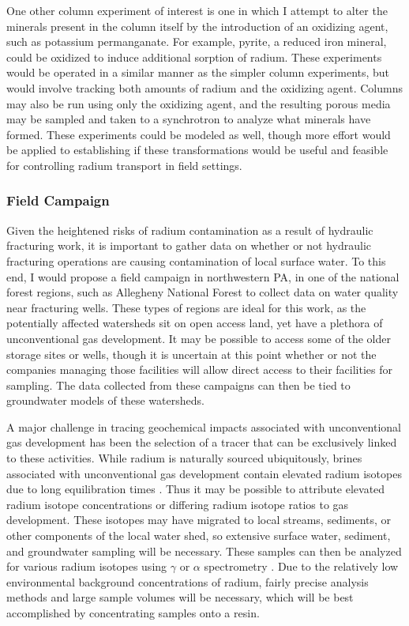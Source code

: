 \documentclass[twoside,12pt,titlepage]{article}
\begin{document}
\par One other column experiment of interest is one in which I attempt to alter the minerals present in the column itself by the introduction of an oxidizing agent, such as potassium permanganate. For example, pyrite, a reduced iron mineral, could be oxidized to induce additional sorption of radium. These experiments would be operated in a similar manner as the simpler column experiments, but would involve tracking both amounts of radium and the oxidizing agent. Columns may also be run using only the oxidizing agent, and the resulting porous media may be sampled and taken to a synchrotron to analyze what minerals have formed. These experiments could be modeled as well, though more effort would be applied to establishing if these transformations would be useful and feasible for controlling radium transport in field settings.

\subsubsection{Field Campaign}
Given the heightened risks of radium contamination as a result of hydraulic fracturing work, it is important to gather data on whether or not hydraulic fracturing operations are causing contamination of local surface water. To this end, I would propose a field campaign in northwestern PA, in one of the national forest regions, such as Allegheny National Forest to collect data on water quality near fracturing wells. These types of regions are ideal for this work, as the potentially affected watersheds sit on open access land, yet have a plethora of unconventional gas development. It may be possible to access some of the older storage sites or wells, though it is uncertain at this point whether or not the companies managing those facilities will allow direct access to their facilities for sampling. The data collected from these campaigns can then be tied to groundwater models of these watersheds.
\par A major challenge in tracing geochemical impacts associated with unconventional gas development has been the selection of a tracer that can be exclusively linked to these activities. While radium is naturally sourced ubiquitously, brines associated with unconventional gas development contain elevated radium isotopes due to long equilibration times \cite{Barbot2013}. Thus it may be possible to attribute elevated radium isotope concentrations or differing radium isotope ratios to gas development. These isotopes may have migrated to local streams, sediments, or other components of the local water shed, so extensive surface water, sediment, and groundwater sampling will be necessary. These samples can then be analyzed for various radium isotopes using $\gamma$ or $\alpha$ spectrometry \cite{Elsinger1982,Bojanowski2005}. Due to the relatively low environmental background concentrations of radium, fairly precise analysis methods and large sample volumes will be necessary, which will be best accomplished by concentrating samples onto a resin. 
\end{document}

